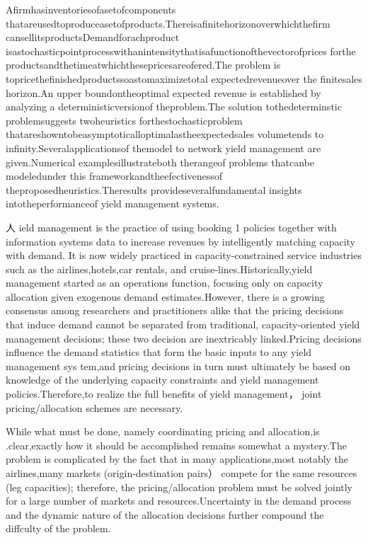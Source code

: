 Afirmhasinventoriesofasetofcomponents
thatareusedtoproduceasetofproducts.Thereisafinitehorizonoverwhichthefirm
cansellitsproductsDemandforachproduct
isastochasticpointprocesswithanintensitythatisafunctionofthevectorofprices
forthe productsandthetimeatwhichthesepricesareofered.The problem is
topricethefinishedproductssoastomaximizetotal expectedrevenueover the
finitesales horizon.An upper boundontheoptimal expected revenue is
established by analyzing a deterministicversionof theproblem.The
solution tothedeterminstic problemsuggests twoheuristics
forthestochasticproblem
thatareshowntobeasymptoticalloptimalastheexpectedsales volumetends to
infinity.Severalapplicationsof themodel to network yield management are
given.Numerical examplesillustrateboth therangeof problems thatcanbe
modeledunder this frameworkandtheefectivenessof
theproposedheuristics.Theresults provideseveralfundamental insights
intotheperformanceof yield management systems.

人 ield management is the practice of using booking 1 policies together
with information systems data to increase revenues by intelligently
matching capacity with demand. It is now widely practiced in
capacity-constrained service industries such as the airlines,hotels,car
rentals, and cruise-lines.Historically,yield management started as an
operations function, focusing only on capacity allocation given
exogenous demand estimates.However, there is a growing consensus among
researchers and practitioners alike that the pricing decisions that
induce demand cannot be separated from traditional, capacity-oriented
yield management decisions; these two decision are inextricably
linked.Pricing decisions influence the demand statistics that form the
basic inputs to any yield management sys tem,and pricing decisions in
turn must ultimately be based on knowledge of the underlying capacity
constraints and yield management policies.Therefore,to realize the full
benefits of yield management， joint pricing/allocation schemes are
necessary.

While what must be done, namely coordinating pricing and allocation,is
.clear,exactly how it should be accomplished remains somewhat a
mystery.The problem is complicated by the fact that in many
applications,most notably the airlines,many markets (origin-destination
pairs） compete for the same resources (leg capacities); therefore, the
pricing/allocation problem must be solved jointly for a large number of
markets and resources.Uncertainty in the demand process and the dynamic
nature of the allocation decisions further compound the diffculty of the
problem.


